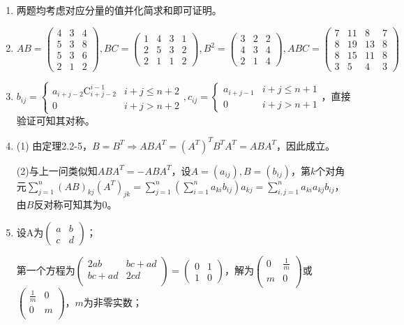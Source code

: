 \documentclass[a4paper,UTF8,fontset=windows]{ctexart}
\begin{document}
\begin{enumerate}
\item 
两题均考虑对应分量的值并化简求和即可证明。

\item
$AB=\begin{pmatrix}4&3&4\\5&3&8\\5&3&6\\2&1&2\end{pmatrix},BC=\begin{pmatrix}1&4&3&1\\2&5&3&2\\2&1&1&2\end{pmatrix},B^2=\begin{pmatrix}3&2&2\\4&3&4\\2&1&4\end{pmatrix},ABC=\begin{pmatrix}7&11&8&7\\8&19&13&8\\8&15&11&8\\3&5&4&3\end{pmatrix}$

\item
$b_{ij}=\begin{cases}a_{i+j-2}\mathrm{C}_{i+j-2}^{i-1}&i+j\le n+2\\0&i+j>n+2\end{cases}, c_{ij}=\begin{cases}a_{i+j-1} &i+j\le n+1\\0&i+j>n+1\end{cases}$，直接验证可知其对称。

\item
(1) 由定理2.2-5，$B=B^T\Rightarrow ABA^T=(A^T)^TB^TA^T=ABA^T$，因此成立。

(2)与上一问类似知$ABA^T=-ABA^T$，设$A=(a_{ij}),B=(b_{ij})$，第$k$个对角元$\sum_{j=1}^{n}(AB)_{kj}(A^T)_{jk}=\sum_{j=1}^{n}\left(\sum_{i=1}^{n}a_{ki}b_{ij}\right)a_{kj}=\sum_{i,j=1}^{n}a_{ki}a_{kj}b_{ij}$，由$B$反对称可知其为0。

\item
设A为$\begin{pmatrix}a&b\\c&d\end{pmatrix}$；

第一个方程为$\begin{pmatrix}2ab&bc+ad\\bc+ad&2cd\\\end{pmatrix}=\begin{pmatrix}0&1\\1&0\end{pmatrix}$，解为$\begin{pmatrix}0&\frac{1}{m}\\m&0\\\end{pmatrix}$或$\begin{pmatrix}\frac{1}{m}&0\\0&m\\\end{pmatrix}$，$m$为非零实数；


\end{enumerate}
\end{document}
